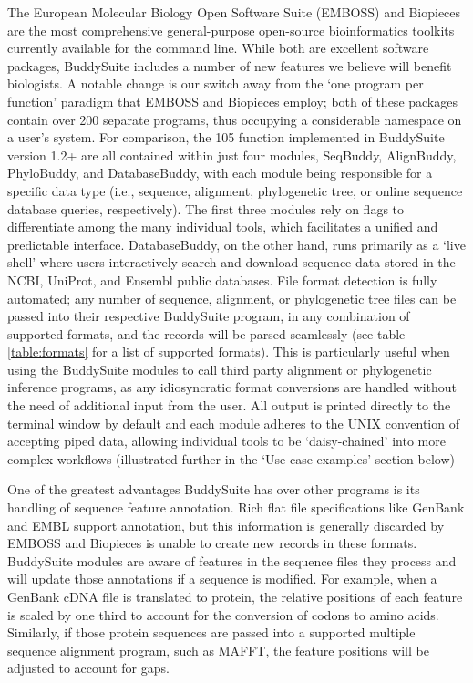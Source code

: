 \documentclass[nogrid]{MBE_article}%
\begin{document}
The European Molecular Biology Open Software Suite (EMBOSS) \cite{Rice:2000wr} and Biopieces are the most comprehensive general-purpose open-source bioinformatics toolkits currently available for the command line. While both are excellent software packages, BuddySuite includes a number of new features we believe will benefit biologists. A notable change is our switch away from the `one program per function' paradigm that EMBOSS and Biopieces employ; both of these packages contain over 200 separate programs, thus occupying a considerable namespace on a user's system. For comparison, the 105 function implemented in BuddySuite version 1.2+ are all contained within just four modules, SeqBuddy, AlignBuddy, PhyloBuddy, and DatabaseBuddy, with each module being responsible for a specific data type (i.e., sequence, alignment, phylogenetic tree, or online sequence database queries, respectively). The first three modules rely on flags to differentiate among the many individual tools, which facilitates a unified and predictable interface. DatabaseBuddy, on the other hand, runs primarily as a `live shell' where users interactively search and download sequence data stored in the NCBI, UniProt, and Ensembl public databases. File format detection is fully automated; any number of sequence, alignment, or phylogenetic tree files can be passed into their respective BuddySuite program, in any combination of supported formats, and the records will be parsed seamlessly (see table \ref{table:formats} for a list of supported formats). This is particularly useful when using the BuddySuite modules to call third party alignment or phylogenetic inference programs, as any idiosyncratic format conversions are handled without the need of additional input from the user. All output is printed directly to the terminal window by default and each module adheres to the UNIX convention of accepting piped data, allowing individual tools to be `daisy-chained' into more complex workflows (illustrated further in the `Use-case examples' section below)

One of the greatest advantages BuddySuite has over other programs is its handling of sequence feature annotation. Rich flat file specifications like GenBank and EMBL support annotation, but this information is generally discarded by EMBOSS and Biopieces is unable to create new records in these formats. BuddySuite modules are aware of features in the sequence files they process and will update those annotations if a sequence is modified. For example, when a GenBank cDNA file is translated to protein, the relative positions of each feature is scaled by one third to account for the conversion of codons to amino acids. Similarly, if those protein sequences are passed into a supported multiple sequence alignment program, such as MAFFT, the feature positions will be adjusted to account for gaps.
\end{document}
